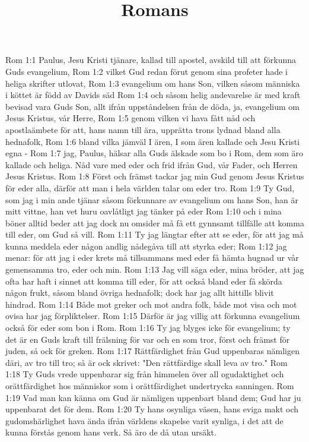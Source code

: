 

\title{Romans}

Rom 1:1  Paulus, Jesu Kristi tjänare, kallad till apostel, avskild till att förkunna Guds evangelium,
Rom 1:2  vilket Gud redan förut genom sina profeter hade i heliga skrifter utlovat,
Rom 1:3  evangelium om hans Son, vilken såsom människa i köttet är född av Davids säd
Rom 1:4  och såsom helig andevarelse är med kraft bevisad vara Guds Son, allt ifrån uppståndelsen från de döda, ja, evangelium om Jesus Kristus, vår Herre,
Rom 1:5  genom vilken vi hava fått nåd och apostlaämbete för att, hans namn till ära, upprätta trons lydnad bland alla hednafolk,
Rom 1:6  bland vilka jämväl I ären, I som ären kallade och Jesu Kristi egna -
Rom 1:7  jag, Paulus, hälsar alla Guds älskade som bo i Rom, dem som äro kallade och heliga. Nåd vare med eder och frid ifrån Gud, vår Fader, och Herren Jesus Kristus.
Rom 1:8  Först och främst tackar jag min Gud genom Jesus Kristus för eder alla, därför att man i hela världen talar om eder tro.
Rom 1:9  Ty Gud, som jag i min ande tjänar såsom förkunnare av evangelium om hans Son, han är mitt vittne, han vet huru oavlåtligt jag tänker på eder
Rom 1:10  och i mina böner alltid beder att jag dock nu omsider må få ett gynnsamt tillfälle att komma till eder, om Gud så vill.
Rom 1:11  Ty jag längtar efter att se eder, för att jag må kunna meddela eder någon andlig nådegåva till att styrka eder;
Rom 1:12  jag menar: för att jag i eder krets må tillsammans med eder få hämta hugnad ur vår gemensamma tro, eder och min.
Rom 1:13  Jag vill säga eder, mina bröder, att jag ofta har haft i sinnet att komma till eder, för att också bland eder få skörda någon frukt, såsom bland övriga hednafolk; dock har jag allt hittills blivit hindrad.
Rom 1:14  Både mot greker och mot andra folk, både mot visa och mot ovisa har jag förpliktelser.
Rom 1:15  Därför är jag villig att förkunna evangelium också för eder som bon i Rom.
Rom 1:16  Ty jag blyges icke för evangelium; ty det är en Guds kraft till frälsning för var och en som tror, först och främst för juden, så ock för greken.
Rom 1:17  Rättfärdighet från Gud uppenbaras nämligen däri, av tro till tro; så är ock skrivet: "Den rättfärdige skall leva av tro."
Rom 1:18  Ty Guds vrede uppenbarar sig från himmelen över all ogudaktighet och orättfärdighet hos människor som i orättfärdighet undertrycka sanningen.
Rom 1:19  Vad man kan känna om Gud är nämligen uppenbart bland dem; Gud har ju uppenbarat det för dem.
Rom 1:20  Ty hans osynliga väsen, hans eviga makt och gudomshärlighet hava ända ifrån världens skapelse varit synliga, i det att de kunna förstås genom hans verk. Så äro de då utan ursäkt.
